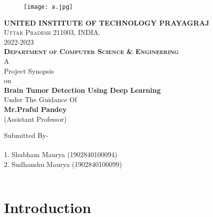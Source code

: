 \documentclass{article}
\date{}
\author{}
\begin{document}
\begin{titlepage}
    \begin{center}
    
        \begin{figure}[h]
            \centering
            \texttt{[image: a.jpg]}
        \end{figure}
          \vspace{5mm}
        \textsc{\large\textbf{UNITED INSTITUTE OF TECHNOLOGY PRAYAGRAJ}\\
        Uttar Pradesh 211003, INDIA.\\
        2022-2023}\\
        \vspace{5mm}
        \textsc{\large\textbf{Department of Computer Science & Engineering}}\\
        
        \vspace{10mm}
        \LARGE A \\[0.5cm] Project Synopsis\\[0.5cm] on\\[0.5cm]
        {\LARGE  \bfseries Brain Tumor Detection Using Deep Learning }\\[0.5cm]
        
         {\large
        Under The Guidance Of\\[0.2cm]
        \textbf{Mr.Praful Pandey } \\[0.2cm]
        (Assistant Professor)\\[0.5cm]
        } 

        {\large 
        Submitted By-\\[0.3cm]
        \\
        1. Shubham Maurya (1902840100094)\\
2. Sudhanshu Maurya (1902840100099) 
        \\[0.1cm]
        }
        \\[0.5]
        

    \end{center}
\end{titlepage}
\maketitle
\Large
\tableofcontents

\newpage



\section{Introduction}
\end{document}
